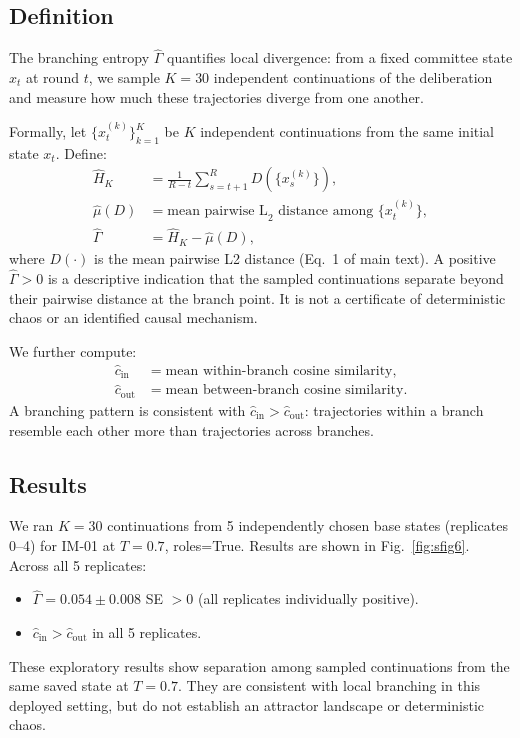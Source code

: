 \documentclass[11pt,onecolumn]{article}
\newcommand{\GamHat}{\ensuremath{\hat{\Gamma}}}
\begin{document}
\subsection{Definition}

The branching entropy $\GamHat$ quantifies local divergence: from a fixed
committee state $x_t$ at round $t$, we sample $K = 30$ independent
continuations of the deliberation and measure how much these trajectories
diverge from one another.

Formally, let $\{x_t^{(k)}\}_{k=1}^K$ be $K$ independent continuations from
the same initial state $x_t$. Define:
\begin{align}
  \hat{H}_K &= \frac{1}{R - t}\sum_{s=t+1}^{R} D(\{x_s^{(k)}\}),\\
  \hat{\mu}(D) &= \text{mean pairwise L}_2 \text{ distance among } \{x_t^{(k)}\},\\
  \GamHat &= \hat{H}_K - \hat{\mu}(D),
\end{align}
where $D(\cdot)$ is the mean pairwise L2 distance (Eq.~1 of main text).
A positive $\GamHat > 0$ is a descriptive indication that the sampled
continuations separate beyond their pairwise distance at the branch point. It
is not a certificate of deterministic chaos or an identified causal mechanism.

We further compute:
\begin{align}
  \hat{c}_{\mathrm{in}} &= \text{mean within-branch cosine similarity},\\
  \hat{c}_{\mathrm{out}} &= \text{mean between-branch cosine similarity}.
\end{align}
A branching pattern is consistent with $\hat{c}_{\mathrm{in}} > \hat{c}_{\mathrm{out}}$:
trajectories within a branch resemble each other more than trajectories
across branches.

\subsection{Results}

We ran $K = 30$ continuations from 5 independently chosen base states
(replicates 0--4) for IM-01 at $T = 0.7$, roles=True.
Results are shown in Fig.~\ref{fig:sfig6}.
Across all 5 replicates:
\begin{itemize}[noitemsep]
  \item $\GamHat = 0.054 \pm 0.008$ SE $> 0$ (all replicates individually positive).
  \item $\hat{c}_{\mathrm{in}} > \hat{c}_{\mathrm{out}}$ in all 5 replicates.
\end{itemize}
These exploratory results show separation among sampled continuations from the
same saved state at $T=0.7$. They are consistent with local branching in this
deployed setting, but do not establish an attractor landscape or deterministic
chaos.
\end{document}
